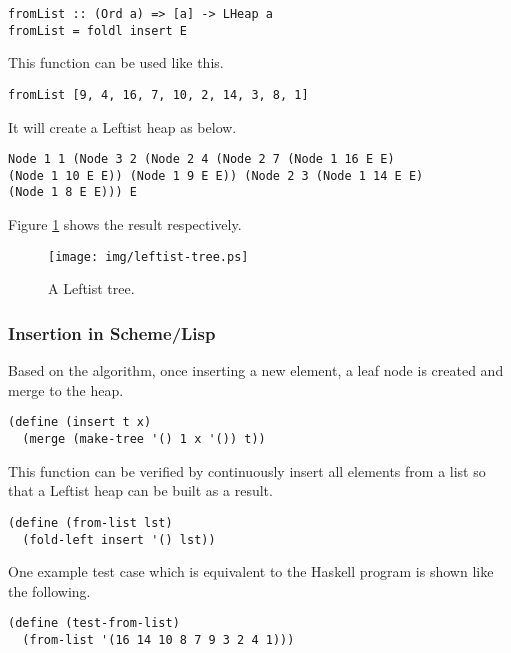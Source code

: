 \documentclass{article}
\begin{document}
\begin{lstlisting}
fromList :: (Ord a) => [a] -> LHeap a
fromList = foldl insert E
\end{lstlisting}

This function can be used like this.

\begin{lstlisting}
fromList [9, 4, 16, 7, 10, 2, 14, 3, 8, 1]
\end{lstlisting}

It will create a Leftist heap as below.

\begin{verbatim}
Node 1 1 (Node 3 2 (Node 2 4 (Node 2 7 (Node 1 16 E E)
(Node 1 10 E E)) (Node 1 9 E E)) (Node 2 3 (Node 1 14 E E)
(Node 1 8 E E))) E
\end{verbatim}

Figure \ref{fig:leftist-tree} shows the result respectively.

\begin{figure}[htbp]
   \begin{center}
   	  \texttt{[image: img/leftist-tree.ps]}
    \caption{A Leftist tree.} \label{fig:leftist-tree}
   \end{center}
\end{figure}

\subsubsection*{Insertion in Scheme/Lisp}

Based on the algorithm, once inserting a new element, a leaf node
is created and merge to the heap.

\lstset{language=lisp}
\begin{lstlisting}
(define (insert t x)
  (merge (make-tree '() 1 x '()) t))
\end{lstlisting}

This function can be verified by continuously insert all elements
from a list so that a Leftist heap can be built as a result.

\begin{lstlisting}
(define (from-list lst)
  (fold-left insert '() lst))
\end{lstlisting}

One example test case which is equivalent to the Haskell program
is shown like the following.

\begin{lstlisting}
(define (test-from-list)
  (from-list '(16 14 10 8 7 9 3 2 4 1)))
\end{lstlisting}
\end{document}

